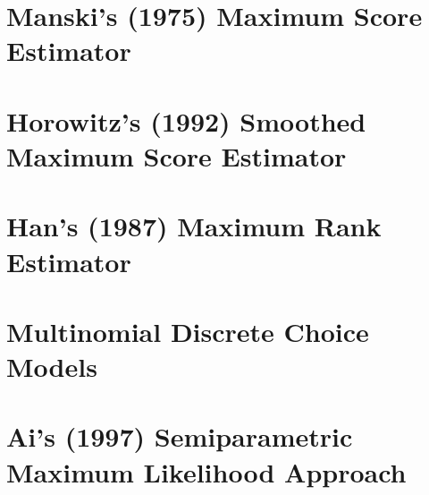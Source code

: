 \documentclass[xcolor=svgnames,dvipdfmx,cjk]{beamer}
\theoremstyle{example}
\begin{document}
\section{Manski's (1975) Maximum Score Estimator}
\begin{frame}
  \tableofcontents[currentsection]
\end{frame}









\section{Horowitz's (1992) Smoothed Maximum Score Estimator}
\begin{frame}
  \tableofcontents[currentsection]
\end{frame}









\section{Han's (1987) Maximum Rank Estimator}
\begin{frame}
  \tableofcontents[currentsection]
\end{frame}









\section{Multinomial Discrete Choice Models}\begin{frame}
  \tableofcontents[currentsection]
\end{frame}









\section{Ai's (1997) Semiparametric Maximum Likelihood Approach}
\begin{frame}
  \tableofcontents[currentsection]
\end{frame}
\end{document}
